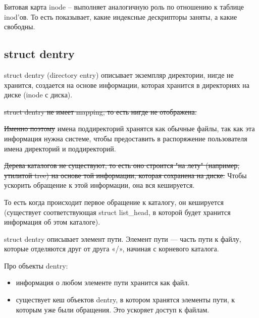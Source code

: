 Битовая карта inode -- выполняет аналогичную роль по отношению к таблице inod'ов. То есть показывает, какие индексные дескрипторы заняты, а какие свободны.

\subsection{struct dentry}

struct dentry (directory entry) описывает экземпляр директории, нигде не хранится, создается на основе информации, которая хранится в директориях на диске (inode с диска).

\sout{struct dentry не имеет mapping, то есть нигде не отображена.}

\sout{Именно поэтому} имена поддиректорий хранятся как обычные файлы, так как эта информация нужна системе, чтобы предоставить в распоряжение пользователя имена директорий и поддиректорий.

\sout{Дерева каталогов не существуют, то есть оно строится "на лету" (например, утилитой tree) на основе той информации, которая сохранена на диске.} Чтобы ускорить обращение к этой информации, она вся кешируется.

То есть когда происходит первое обращение к каталогу, он кешируется (существует соответствующая struct list\_head, в которой будет хранится информация об этом каталоге).

struct dentry описывает элемент пути. Элемент пути — часть пути к файлу, которые отделяются друг от друга «/», начиная с корневого каталога.

Про объекты dentry:
\begin{itemize}
\item  информация о любом элементе пути хранится как файл.
\item существует кеш объектов dentry, в котором хранятся элементы пути, к которым уже были обращения. Это ускоряет доступ к файлам.
\end{itemize}

